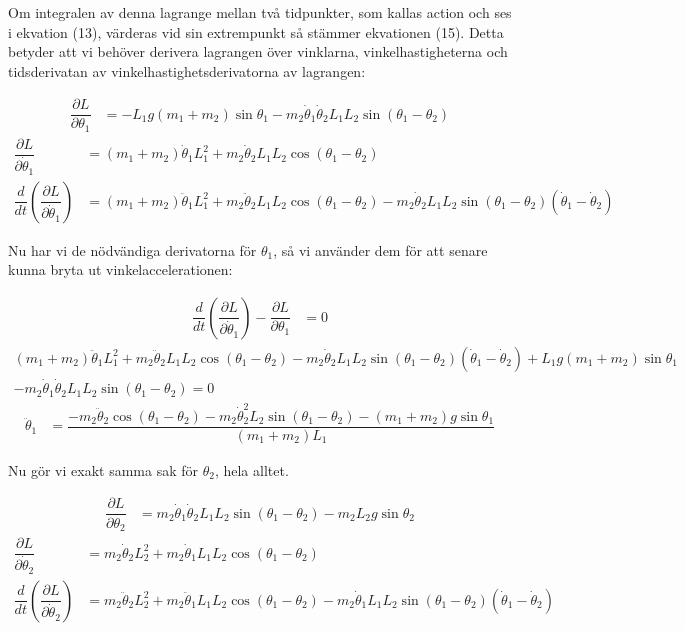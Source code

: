 \documentclass[10pt, a4paper]{amsart}
\begin{document}
Om integralen av denna lagrange mellan två tidpunkter, 
som kallas action och ses i ekvation (13), 
värderas vid sin extrempunkt så stämmer ekvationen (15). 
Detta betyder att vi behöver derivera lagrangen över vinklarna, 
vinkelhastigheterna och tidsderivatan av vinkelhastighetsderivatorna av lagrangen: \bigskip 

\begin{align}
    \dfrac{\partial L}{\partial\theta_1} &= -L_1g(m_1+m_2)\sin\theta_1 - m_2\dot\theta_1\dot\theta_2L_1L_2\sin(\theta_1 - \theta_2)
\end{align}
\begin{align}
    \dfrac{\partial L}{\partial\dot\theta_1} &= (m_1 + m_2)\dot\theta_1L_1^2 + m_2\dot\theta_2L_1L_2\cos(\theta_1 - \theta_2) \\
    \dfrac{d}{dt} (\dfrac{\partial L}{\partial\dot\theta_1}) &= (m_1 + m_2)\ddot\theta_1L_1^2 + m_2\ddot\theta_2L_1L_2\cos(\theta_1 - \theta_2) - m_2\dot\theta_2L_1L_2\sin(\theta_1 - \theta_2)(\dot\theta_1 - \dot\theta_2)
\end{align} \bigskip 

Nu har vi de nödvändiga derivatorna för $ \theta_1 $, så vi använder dem för att senare kunna bryta ut vinkelaccelerationen: \bigskip 


\begin{align}
    \dfrac{d}{dt} (\dfrac{\partial L}{\partial\dot\theta_1}) - \dfrac{\partial L}{\partial\theta_1} &= 0
\end{align}
\begin{multline}
    (m_1 + m_2)\ddot\theta_1L_1^2 + m_2\ddot\theta_2L_1L_2\cos(\theta_1 - \theta_2) - m_2\dot\theta_2L_1L_2\sin(\theta_1 - \theta_2)(\dot\theta_1 - \dot\theta_2) + L_1g(m_1+m_2)\sin\theta_1 \\ - m_2\dot\theta_1\dot\theta_2L_1L_2\sin(\theta_1 - \theta_2) = 0
\end{multline}
\begin{align}
    \ddot\theta_1 &= \dfrac{-m_2\ddot\theta_2\cos(\theta_1 - \theta_2) - m_2\dot\theta_2^2L_2\sin(\theta_1 - \theta_2) - (m_1 + m_2)g\sin\theta_1}{(m_1 + m_2)L_1}
\end{align} \bigskip 

Nu gör vi exakt samma sak för $ \theta_2 $, hela alltet.

\begin{align}
    \dfrac{\partial L}{\partial\theta_2} &= m_2\dot\theta_1\dot\theta_2L_1L_2\sin(\theta_1 - \theta_2) - m_2L_2g\sin\theta_2
\end{align}
\begin{align}
    \dfrac{\partial L}{\partial\dot\theta_2} &= m_2\dot\theta_2L_2^2 + m_2\dot\theta_1L_1L_2\cos(\theta_1 - \theta_2) \\
    \dfrac{d}{dt} (\dfrac{\partial L}{\partial\dot\theta_2}) &= m_2\ddot\theta_2L_2^2 + m_2\ddot\theta_1L_1L_2\cos(\theta_1 - \theta_2) - m_2\dot\theta_1L_1L_2\sin(\theta_1 - \theta_2)(\dot\theta_1 - \dot\theta_2)
\end{align} \bigskip 
\end{document}
